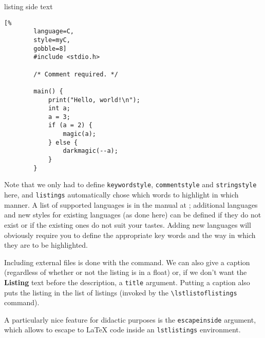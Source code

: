 \documentclass[article,a4paper,oneside,10pt]{memoir}
\newcommand\code[1]{\texttt{#1}}
\begin{document}
\begin{tcblisting}{listing side text}
    \begin{lstlisting}[%
        language=C,
        style=myC,
        gobble=8]
        #include <stdio.h>

        /* Comment required. */

        main() {
            print("Hello, world!\n");
            int a;
            a = 3;
            if (a = 2) {
                magic(a);
            } else {
                darkmagic(--a);
            }
        }
    \end{lstlisting}
\end{tcblisting}

Note that we  only had to define  \code{keywordstyle}, \code{commentstyle} and
\code{stringstyle} here,  and \code{listings} automatically chose  which words
to highlight in  which manner. A list of supported languages  is in the manual
at \cite{listings}; additional languages and new styles for existing languages
(as done here) can be defined if they  do not exist or if the existing ones do
not  suit your  tastes. Adding new  languages  will obviously  require you  to
define  the  appropriate key  words  and  the way  in  which  they are  to  be
highlighted.

Including external files is  done with the \verb|| command. We
can also  give a caption  (regardless of  whether or not  the listing is  in a
float) or, if we don't want  the \textbf{Listing} text before the description,
a \code{title} argument. Putting  a caption also puts the listing  in the list
of listings (invoked by the \verb|\lstlistoflistings| command).

\begin{tcblisting}{}
    
\end{tcblisting}

A particularly nice  feature for didactic purposes  is the \code{escapeinside}
argument, which allows to escape to \LaTeX{} code inside an \code{lstlistings}
environment.
\end{document}
